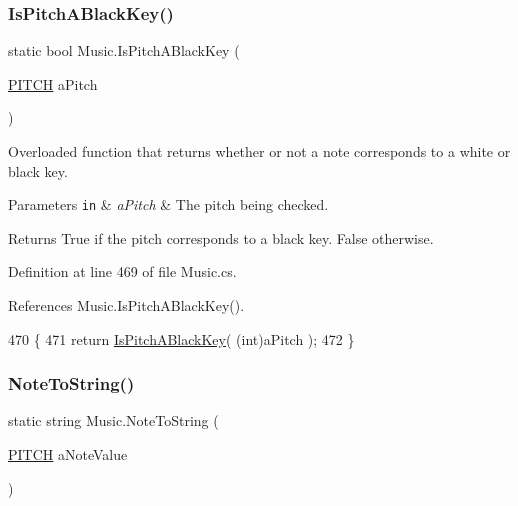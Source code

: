\subsubsection{\texorpdfstring{Is\+Pitch\+A\+Black\+Key()}{IsPitchABlackKey()}\hspace{0.1cm}{\footnotesize\ttfamily [2/2]}}
{\footnotesize\ttfamily static bool Music.\+Is\+Pitch\+A\+Black\+Key (\begin{DoxyParamCaption}\item[{\hyperlink{group___music_enums_ga508f69b199ea518f935486c990edac1d}{P\+I\+T\+CH}}]{a\+Pitch }\end{DoxyParamCaption})\hspace{0.3cm}{\ttfamily [static]}}



Overloaded function that returns whether or not a note corresponds to a white or black key. 


\begin{DoxyParams}[1]{Parameters}
\mbox{\tt in}  & {\em a\+Pitch} & The pitch being checked. \\
\hline
\end{DoxyParams}
\begin{DoxyReturn}{Returns}
True if the pitch corresponds to a black key. False otherwise. 
\end{DoxyReturn}


Definition at line 469 of file Music.\+cs.



References Music.\+Is\+Pitch\+A\+Black\+Key().


\begin{DoxyCode}
470     \{
471         \textcolor{keywordflow}{return} \hyperlink{group___music_stat_func_gacc2c1a66df7197225f61c5737f794065}{IsPitchABlackKey}( (\textcolor{keywordtype}{int})aPitch );
472     \}
\end{DoxyCode}
\mbox{\label{group___music_stat_func_ga85a22c905d56d4c5f4e62159bfecee8c}} 
\subsubsection{\texorpdfstring{Note\+To\+String()}{NoteToString()}\hspace{0.1cm}{\footnotesize\ttfamily [1/2]}}
{\footnotesize\ttfamily static string Music.\+Note\+To\+String (\begin{DoxyParamCaption}\item[{\hyperlink{group___music_enums_ga508f69b199ea518f935486c990edac1d}{P\+I\+T\+CH}}]{a\+Note\+Value }\end{DoxyParamCaption})\hspace{0.3cm}{\ttfamily [static]}}



